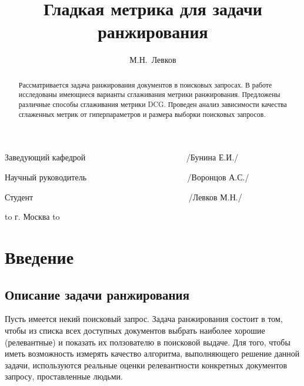 \documentclass[12pt,a4paper]{amsart}
\theoremstyle{definition}
\theoremstyle{definition}
\newenvironment{nouppercase}{%
  \let\uppercase\relax%
  \renewcommand{\uppercasenonmath}[1]{}}{}
\begin{document}
\begin{titlepage}
Заведующий кафедрой \verb"              " \underline{\quad \quad \quad \quad \quad \quad \quad}
\verb"        "
/Бунина Е.И./

Научный руководитель \verb"              " \underline{\quad \quad \quad \quad \quad \quad \quad}
\verb"        "
/Воронцов А.С./

Студент \verb"                           " \underline{\quad \quad \quad \quad \quad \quad \quad}
\verb"        "
/Левков М.Н./

\vspace{1.0cm}

\hbox to \textwidth
{
\hss г. Москва \hss
}
\hbox to \textwidth
{
 \hss
}

\end{titlepage}


\title{Гладкая метрика для задачи ранжирования}

\author{М.Н.~Левков}


\begin{abstract}
Рассматривается задача ранжирования документов в поисковых запросах. В работе исследованы имеющиеся варианты сглаживания метрики ранжирования. Предложены различные способы сглаживания метрики DCG. Проведен анализ зависимости качества сглаженных метрик от гиперпараметров и размера выборки поисковых запросов.
\end{abstract}


\begin{nouppercase}
\maketitle
\end{nouppercase}

\tableofcontents

\pagebreak


\section{Введение}

\subsection{Описание задачи ранжирования}
Пусть имеется некий поисковый запрос. Задача ранжирования состоит в том, чтобы из списка всех доступных документов выбрать наиболее хорошие (релевантные) и показать их ползователю в поисковой выдаче. Для того, чтобы иметь возможность измерять качество алгоритма, выполняющего решение данной задачи, используются реальные оценки релевантности конкретных документов запросу, проставленные людьми.
\end{document}
